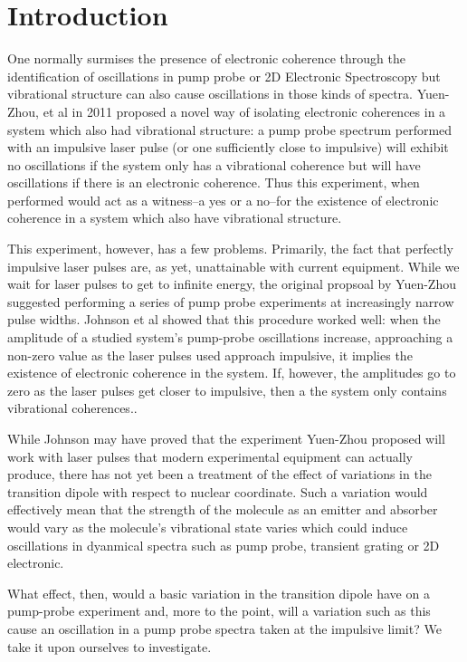 \section{Introduction}
One normally surmises the presence of electronic coherence through the identification of oscillations in pump probe or 2D Electronic Spectroscopy but vibrational structure can also cause oscillations in those kinds of spectra.  Yuen-Zhou, et al  in 2011 proposed a novel way of isolating electronic coherences in a system which also had vibrational structure: a pump probe spectrum performed with an impulsive laser pulse (or one sufficiently close to impulsive) will exhibit no oscillations if the system only has a vibrational coherence but will have oscillations if there is an electronic coherence.  Thus this experiment, when performed would act as a witness--a yes or a no--for the existence of electronic coherence in a system which also have vibrational structure.

This experiment, however, has a few problems.  Primarily, the fact that perfectly impulsive laser pulses are, as yet, unattainable with current equipment.  While we wait for laser pulses to get to infinite energy, the original propsoal by Yuen-Zhou suggested performing a series of pump probe experiments at increasingly narrow pulse widths.  Johnson et al\cite{allanWitness} showed that this procedure worked well: when the amplitude of a studied system's pump-probe oscillations increase, approaching a non-zero value as the laser pulses used approach impulsive, it implies the existence of electronic coherence in the system.  If, however, the amplitudes go to zero as the laser pulses get closer to impulsive, then a the system only contains vibrational coherences..

While Johnson may have proved that the experiment Yuen-Zhou proposed will work with laser pulses that modern experimental equipment can actually produce, there has not yet been a treatment of the effect of variations in the transition dipole with respect to nuclear coordinate.  Such a variation would effectively mean that the strength of the molecule as an emitter and absorber would vary as the molecule's vibrational state varies which could induce oscillations in dyanmical spectra such as pump probe, transient grating or 2D electronic.

What effect, then, would a basic variation in the transition dipole have on a pump-probe experiment and, more to the point, will a variation such as this cause an oscillation in a pump probe spectra taken at the impulsive limit?  We take it upon ourselves to investigate.

